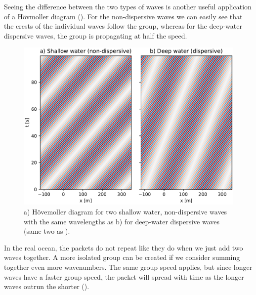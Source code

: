 Seeing the difference between the two types of waves is another useful application of a H\"ovmoller diagram ().  For the non-dispersive waves we can easily see that the crests of the individual waves follow the group, whereas for the deep-water dispersive waves, the group is propagating at half the speed.  

\begin{figure}[hbt]
  \begin{center}
    \includegraphics{figs/Waves/Hovmoller}
    \caption{a) H\"ovemoller diagram for two shallow water, non-dispersive waves with the same wavelengths as  b) for deep-water dispersive waves (same two as ).}  
    \label{fig:Hovmoller}  
  \end{center}
\end{figure}

In the real ocean, the packets do not repeat like they do when we just add two waves together.  A more isolated group can be created if we consider summing together even more wavenumbers.  The same group speed applies, but since longer waves have a faster group speed, the packet will spread with time as the longer waves outrun the shorter ().  

